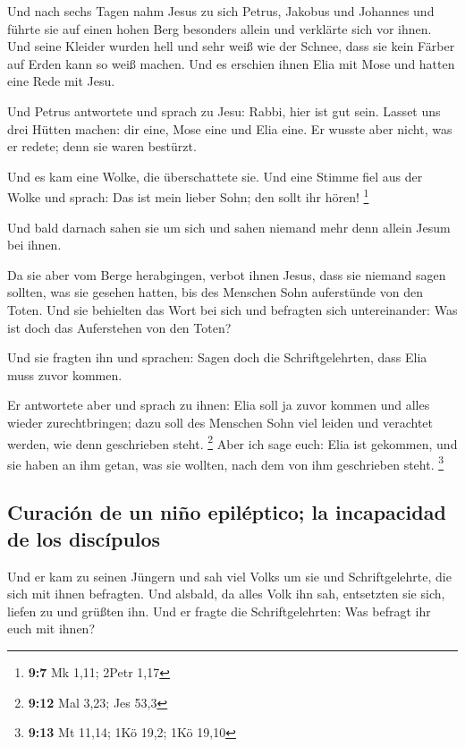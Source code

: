  Und nach sechs Tagen nahm Jesus zu sich Petrus, Jakobus
und Johannes und führte sie auf einen hohen Berg besonders allein und
verklärte sich vor ihnen.  Und seine Kleider wurden hell
und sehr weiß wie der Schnee, dass sie kein Färber auf Erden kann so
weiß machen.  Und es erschien ihnen Elia mit Mose und
hatten eine Rede mit Jesu.

 Und Petrus antwortete und sprach zu Jesu: Rabbi, hier ist
gut sein. Lasset uns drei Hütten machen: dir eine, Mose eine und Elia
eine.  Er wusste aber nicht, was er redete; denn sie waren
bestürzt.

 Und es kam eine Wolke, die überschattete sie. Und eine
Stimme fiel aus der Wolke und sprach: Das ist mein lieber Sohn; den
sollt ihr hören! \footnote{\textbf{9:7} Mk 1,11; 2Petr 1,17}

 Und bald darnach sahen sie um sich und sahen niemand mehr
denn allein Jesum bei ihnen.

 Da sie aber vom Berge herabgingen, verbot ihnen Jesus,
dass sie niemand sagen sollten, was sie gesehen hatten, bis des Menschen
Sohn auferstünde von den Toten.  Und sie behielten das
Wort bei sich und befragten sich untereinander: Was ist doch das
Auferstehen von den Toten?

 Und sie fragten ihn und sprachen: Sagen doch die
Schriftgelehrten, dass Elia muss zuvor kommen.

 Er antwortete aber und sprach zu ihnen: Elia soll ja
zuvor kommen und alles wieder zurechtbringen; dazu soll des Menschen
Sohn viel leiden und verachtet werden, wie denn geschrieben steht.
\footnote{\textbf{9:12} Mal 3,23; Jes 53,3}  Aber ich
sage euch: Elia ist gekommen, und sie haben an ihm getan, was sie
wollten, nach dem von ihm geschrieben steht. \footnote{\textbf{9:13} Mt
  11,14; 1Kö 19,2; 1Kö 19,10}

\hypertarget{curaciuxf3n-de-un-niuxf1o-epiluxe9ptico-la-incapacidad-de-los-discuxedpulos}{%
\subsection{Curación de un niño epiléptico; la incapacidad de los
discípulos}\label{curaciuxf3n-de-un-niuxf1o-epiluxe9ptico-la-incapacidad-de-los-discuxedpulos}}

 Und er kam zu seinen Jüngern und sah viel Volks um sie
und Schriftgelehrte, die sich mit ihnen befragten.  Und
alsbald, da alles Volk ihn sah, entsetzten sie sich, liefen zu und
grüßten ihn.  Und er fragte die Schriftgelehrten: Was
befragt ihr euch mit ihnen?

